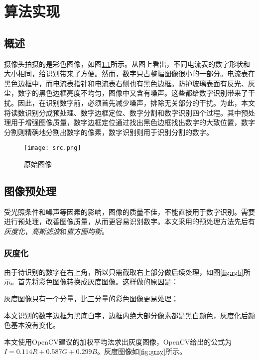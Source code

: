 
\chapter{算法实现}

\section{概述}

摄像头拍摄的是彩色图像，如图\ref{fig:src}所示。从图上看出，不同电流表的数字形状和大小相同，给识别带来了方便。然而，数字只占整幅图像很小的一部分。电流表在黑色边框中，而电流表指针和电流表右侧也有黑色边框。防护玻璃表面有反光、灰尘，数字的黑色边框亮度不均匀，图像中又含有噪声。这些都给数字识别带来了干扰。因此，在识别数字前，必须首先减少噪声，排除无关部分的干扰。为此，本文将读数识别分成预处理、数字边框定位、数字分割和数字识别四个过程。其中预处理用于增强图像质量，数字边框定位通过找出黑色边框找出数字的大致位置，数字分割则精确地分割出数字的像素，数字识别则用于识别分割的数字。

\begin{figure}[h]
  \centering
  \texttt{[image: src.png]}
  \caption{原始图像}
  \label{fig:src}
\end{figure}

\section{图像预处理}

受光照条件和噪声等因素的影响，图像的质量不佳，不能直接用于数字识别。需要进行预处理，改善图像质量，从而更容易识别数字。本文采用的预处理方法先后有\emph{灰度化}，\emph{高斯滤波}和\emph{直方图均衡}。

\subsection{灰度化}



由于待识别的数字在右上角，所以只需截取右上部分做后续处理，如图\ref{fig:rgb}所示。首先将彩色图像转换成灰度图像。这样做的原因是：
\begin{asparaenum}[(1)]
\item 灰度图像只有一个分量，比三分量的彩色图像更易处理；
\item 本文识别的数字边框为黑底白字，边框内绝大部分像素都是黑白颜色，灰度化后颜色基本没有变化。
\end{asparaenum}

本文使用OpenCV建议的加权平均法求出灰度图像，OpenCV给出的公式为$I=0.114R+0.587G+0.299B$。灰度图像如\ref{fig:gray}所示。

